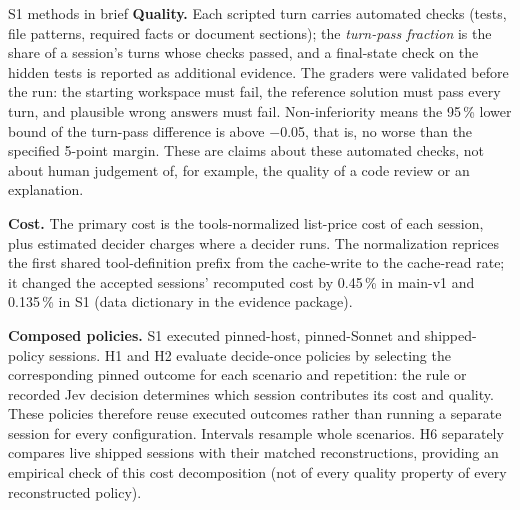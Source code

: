 \documentclass[11pt,letterpaper]{article}
\newcommand{\term}[1]{\emph{#1}}
\newcommand{\NIMargin}{$-$0.05}
\newcommand{\NIMarginPts}{5}
\newcommand{\NormShareMain}{0.45}
\newcommand{\NormShareSone}{0.135}
\begin{document}
\begin{casecard}{S1 methods in brief}
\textbf{Quality.} Each scripted turn carries automated checks (tests, file patterns, required facts or document
sections); the \term{turn-pass fraction} is the share of a session's turns whose checks passed, and a final-state check
on the hidden tests is reported as additional evidence. The graders were validated before the run: the starting
workspace must fail, the reference solution must pass every turn, and plausible wrong answers must fail.
Non-inferiority means the 95\,\% lower bound of the turn-pass difference is above \NIMargin, that is, no worse than the
specified \NIMarginPts-point margin. These are claims about these automated checks, not about human judgement of, for
example, the quality of a code review or an explanation.

\textbf{Cost.} The primary cost is the tools-normalized list-price cost of each session, plus estimated decider charges
where a decider runs. The normalization reprices the first shared tool-definition prefix from the cache-write to the
cache-read rate; it changed the accepted sessions' recomputed cost by \NormShareMain\,\% in main-v1 and \NormShareSone\,\%
in S1 (data dictionary in the evidence package).

\textbf{Composed policies.} S1 executed pinned-host, pinned-Sonnet and shipped-policy sessions. H1 and H2 evaluate
decide-once policies by selecting the corresponding pinned outcome for each scenario and repetition: the rule or recorded
Jev decision determines which session contributes its cost and quality. These policies therefore reuse executed outcomes
rather than running a separate session for every configuration. Intervals resample whole scenarios. H6 separately
compares live shipped sessions with their matched reconstructions, providing an empirical check of this cost
decomposition (not of every quality property of every reconstructed policy).
\end{casecard}
\end{document}
